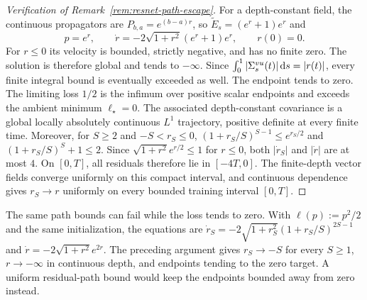\begin{proof}[Verification of Remark~\ref{rem:resnet-path-escape}]
For a depth-constant field, the continuous propagators are
$P_{b,a}=e^{(b-a)r}$, so $\widetilde E_s=(e^r+1)e^r$ and
\begin{equation}\label{eq:resnet-escape-continuous}
 p=e^r,\qquad \dot r=-2\sqrt{1+r^2}(e^r+1)e^r,\qquad r(0)=0.
\end{equation}
For $r\le0$ its velocity is bounded, strictly negative, and has no finite
zero. The solution is therefore global and tends to $-\infty$.
Since $\int_0^1|\Sigma^{vu}_s(t)|\,\mathrm{d} s=|r(t)|$, every finite integral
bound is eventually exceeded as well. The endpoint tends to zero.
The limiting loss $1/2$ is the infimum over positive scalar endpoints
and exceeds the ambient minimum $\ell_\star=0$.
The associated depth-constant covariance is a global locally absolutely
continuous $L^1$ trajectory, positive definite at every finite time.
Moreover, for $S\ge2$ and $-S<r_S\le0$,
$(1+r_S/S)^{S-1}\le e^{r_S/2}$ and $(1+r_S/S)^S+1\le2$.
Since $\sqrt{1+r^2}e^{r/2}\le1$ for $r\le0$, both $|\dot r_S|$ and
$|\dot r|$ are at most $4$. On $[0,T]$, all residuals therefore lie in
$[-4T,0]$. The finite-depth vector fields converge uniformly on this
compact interval, and continuous dependence gives $r_S\to r$ uniformly
on every bounded training interval $[0,T]$.
\end{proof}

\begin{remark}
The same path bounds can fail while the loss tends to zero. With
$\ell(p):=p^2/2$ and the same initialization, the equations are
$\dot r_S=-2\sqrt{1+r_S^2}(1+r_S/S)^{2S-1}$ and
$\dot r=-2\sqrt{1+r^2}e^{2r}$. The preceding argument gives
$r_S\to-S$ for every $S\ge1$, $r\to-\infty$ in continuous depth,
and endpoints tending to the zero target. A uniform residual-path
bound would keep the endpoints bounded away from zero instead.
\end{remark}

